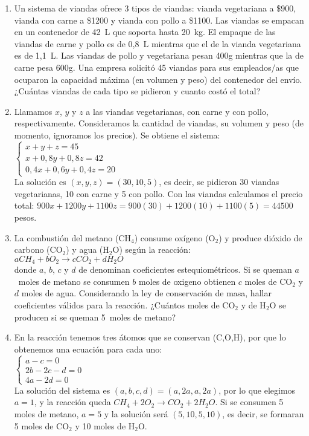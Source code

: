 \documentclass[a4paper]{article}
\newcommand{\answer}{\item[**]}
\begin{document}
\begin{enumerate}
\begin{enumerate} [label=(\alph*)]
		\item Un sistema de viandas ofrece 3 tipos de viandas: vianda vegetariana a \$900, vianda con carne a \$1200 y vianda con pollo a \$1100.  Las viandas se empacan en un contenedor de 42~L que soporta hasta 20~kg. El empaque de las viandas de carne y pollo es de 0,8~L mientras que el de la vianda vegetariana es de 1,1~L. Las viandas de pollo y vegetariana pesan 400g mientras que la de carne pesa 600g. Una empresa solicitó 45 viandas para sus empleados/as que ocuparon la capacidad máxima (en volumen y peso) del contenedor del envío. ¿Cuántas viandas de cada tipo se pidieron y cuanto costó el total?
		\answer Llamamos $x$, $y$ y $z$ a las viandas vegetarianas, con carne y con pollo, respectivamente. Consideramos la cantidad de viandas, su volumen y peso (de momento, ignoramos los precios). Se obtiene el sistema: \\ \vspace{2mm} $\left\{\begin{matrix} x+y+z=45 \\ x+0,8y+0,8z=42 \\ 0,4x+0,6y+0,4z=20 \end{matrix}\right.$ \\ La solución es $(x,y,z)=(30,10,5)$, es decir, se pidieron 30 viandas vegetarianas, 10 con carne y 5 con pollo. Con las viandas calculamos el precio total: $900x+1200y+1100z=900(30)+1200(10)+1100(5)=44500$ pesos.

		\item La combustión del metano (CH$_4$) consume oxígeno (O$_2$) y produce dióxido de carbono (CO$_2$) y agua (H$_2$O) según la reacción: \\ \phantom{-------------------------------------------------}$ aCH_4 + bO_2 \to cCO_2 + d H_{2}O$ \\ donde $a$, $b$, $c$ y $d$ de denominan coeficientes estequiométricos. Si se queman $a$~moles de metano se consumen $b$ moles de oxigeno obtienen $c$ moles de CO$_2$ y $d$ moles de agua. Considerando la ley de conservación de masa, hallar coeficientes válidos para la reacción. ¿Cuántos moles de CO$_2$ y de H$_2$O se producen si se queman 5~moles de metano? 
		\answer En la reacción tenemos tres átomos que se conservan (C,O,H), por que lo obtenemos una ecuación para cada uno: \\ \vspace{2mm} $\left\{\begin{matrix} a-c = 0 \\ 2b -2c -d = 0 \\ 4a - 2d = 0 \end{matrix}\right.$ \\ La solución del sistema es $(a,b,c,d) = (a,2a,a,2a)$, por lo que elegimos $a=1$, y la reacción queda $ CH_4 + 2O_2 \to CO_2 + 2 H_{2}O$. Si se consumen 5 moles de metano, $a=5$ y la solución será $(5,10,5,10)$, es decir, se formaran 5 moles de CO$_2$ y 10 moles de H$_2$O.

	\end{enumerate}


\end{enumerate}
\end{document}
